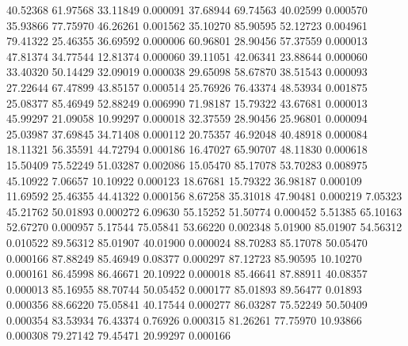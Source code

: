        40.52368       61.97568       33.11849       0.000091
       37.68944       69.74563       40.02599       0.000570
       35.93866       77.75970       46.26261       0.001562
       35.10270       85.90595       52.12723       0.004961
       79.41322       25.46355       36.69592       0.000006
       60.96801       28.90456       57.37559       0.000013
       47.81374       34.77544       12.81374       0.000060
       39.11051       42.06341       23.88644       0.000060
       33.40320       50.14429       32.09019       0.000038
       29.65098       58.67870       38.51543       0.000093
       27.22644       67.47899       43.85157       0.000514
       25.76926       76.43374       48.53934       0.001875
       25.08377       85.46949       52.88249       0.006990
       71.98187       15.79322       43.67681       0.000013
       45.99297       21.09058       10.99297       0.000018
       32.37559       28.90456       25.96801       0.000094
       25.03987       37.69845       34.71408       0.000112
       20.75357       46.92048       40.48918       0.000084
       18.11321       56.35591       44.72794       0.000186
       16.47027       65.90707       48.11830       0.000618
       15.50409       75.52249       51.03287       0.002086
       15.05470       85.17078       53.70283       0.008975
       45.10922        7.06657       10.10922       0.000123
       18.67681       15.79322       36.98187       0.000109
       11.69592       25.46355       44.41322       0.000156
	8.67258       35.31018       47.90481       0.000219
	7.05323       45.21762       50.01893       0.000272
	6.09630       55.15252       51.50774       0.000452
	5.51385       65.10163       52.67270       0.000957
	5.17544       75.05841       53.66220       0.002348
	5.01900       85.01907       54.56312       0.010522
       89.56312       85.01907       40.01900       0.000024
       88.70283       85.17078       50.05470       0.000166
       87.88249       85.46949        0.08377       0.000297
       87.12723       85.90595       10.10270       0.000161
       86.45998       86.46671       20.10922       0.000018
       85.46641       87.88911       40.08357       0.000013
       85.16955       88.70744       50.05452       0.000177
       85.01893       89.56477        0.01893       0.000356
       88.66220       75.05841       40.17544       0.000277
       86.03287       75.52249       50.50409       0.000354
       83.53934       76.43374        0.76926       0.000315
       81.26261       77.75970       10.93866       0.000308
       79.27142       79.45471       20.99297       0.000166
